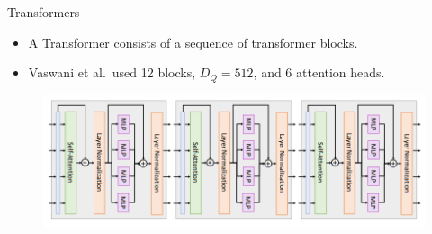 \begin{frame}{Transformers}

\begin{itemize}
    \item A Transformer consists of a sequence of transformer blocks.
    \item Vaswani et al.\ used 12 blocks, $D_Q = 512$, and 6 attention heads.
\end{itemize}

\begin{figure}
\centering
\includegraphics[width=1.0\textwidth,height=1.0\textheight,keepaspectratio]{images/advanced-cv/transformers_3.png}
\end{figure} 
    
\end{frame}

